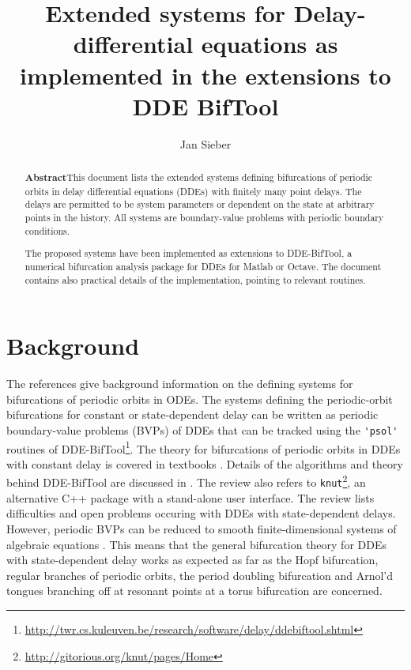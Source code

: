 \documentclass[11pt]{scrartcl}
\title{Extended systems for 
  Delay-differential equations as 
  implemented in the extensions to  DDE BifTool}
\author{Jan Sieber}\date{}
\newcommand{\blist}[1]{\mbox{\lstinline!#1!}}
\begin{document}
\maketitle
\tableofcontents
\begin{abstract}
  \noindent
  \textbf{\textsf{Abstract}}\quad This document lists the extended
  systems defining bifurcations of periodic orbits in delay
  differential equations (DDEs) with finitely many point delays. The
  delays are permitted to be system parameters or dependent on the
  state at arbitrary points in the history. All systems are
  boundary-value problems with periodic boundary conditions.

  The proposed systems have been implemented as extensions to
  DDE-BifTool, a numerical bifurcation analysis package for DDEs for
  Matlab or Octave. The document contains also practical details of
  the implementation, pointing to relevant routines.
\end{abstract}


\section{Background}
\label{sec:background}
The references \cite{MDO09,G00,Doed07,DCFKSW98} give background
information on the defining systems for bifurcations of periodic
orbits in ODEs.  The systems defining the periodic-orbit bifurcations
for constant or state-dependent delay can be written as periodic
boundary-value problems (BVPs) of DDEs that can be tracked using the
\blist{'psol'} routines of
DDE-BifTool\footnote{\url{http://twr.cs.kuleuven.be/research/software/delay/ddebiftool.shtml}}. The
theory for bifurcations of periodic orbits in DDEs with constant delay
is covered in textbooks \cite{S89,Hale93,Diek95}. Details of the
algorithms and theory behind DDE-BifTool are discussed in
\cite{ELS01,ELR02,SER02,RS07,VLR08}. The review \cite{RS07} also
refers to
\texttt{knut}\footnote{\url{http://gitorious.org/knut/pages/Home}}, an
alternative C++ package with a stand-alone user interface. The review
\cite{HKWW06} lists difficulties and open problems occuring with DDEs
with state-dependent delays. However, periodic BVPs can be reduced to
smooth finite-dimensional systems of algebraic equations
\cite{S12}. This means that the general bifurcation theory for DDEs
with state-dependent delay works as expected as far as the Hopf
bifurcation, regular branches of periodic orbits, the period doubling
bifurcation and Arnol'd tongues branching off at resonant points at a
torus bifurcation are concerned.
\end{document}
